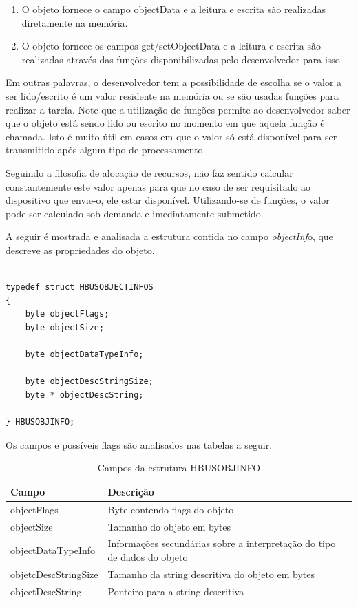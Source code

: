 \documentclass[11pt]{report}
\begin{document}
\begin{enumerate}

\item O objeto fornece o campo objectData e a leitura e escrita são realizadas diretamente na memória.
\item O objeto fornece os campos get/setObjectData e a leitura e escrita são realizadas através das funções disponibilizadas pelo desenvolvedor para isso.

\end{enumerate}

Em outras palavras, o desenvolvedor tem a possibilidade de escolha se o valor a ser lido/escrito é um valor residente na memória ou se são usadas funções para realizar a tarefa. Note que a utilização de funções permite ao desenvolvedor saber que o objeto está sendo lido ou escrito no momento em que aquela função é chamada. Isto é muito útil em casos em que o valor só está disponível para ser transmitido após algum tipo de processamento.

Seguindo a filosofia de alocação de recursos, não faz sentido calcular constantemente este valor apenas para que no caso de ser requisitado ao dispositivo que envie-o, ele estar disponível. Utilizando-se de funções, o valor pode ser calculado sob demanda e imediatamente submetido.

\vskip1cm

A seguir é mostrada e analisada a estrutura contida no campo \textit{objectInf}o, que descreve as propriedades do objeto.

\pagebreak

\begin{verbatim}

typedef struct HBUSOBJECTINFOS
{
	byte objectFlags;
	byte objectSize;
	
	byte objectDataTypeInfo;
	
	byte objectDescStringSize;
	byte * objectDescString;
	
} HBUSOBJINFO;

\end{verbatim}

Os campos e possíveis flags são analisados nas tabelas a seguir.

\begin{table}[H]
\centering
\caption{Campos da estrutura HBUSOBJINFO}
\begin{tabular}{l p{10cm}}

\hline
Campo					&	Descrição\\
\hline
objectFlags				&	Byte contendo flags do objeto\\
objectSize				&	Tamanho do objeto em bytes\\
objectDataTypeInfo		&	Informações secundárias sobre a interpretação do tipo de dados do objeto\\
objetcDescStringSize		&	Tamanho da string descritiva do objeto em bytes\\
objectDescString			&	Ponteiro para a string descritiva\\
\hline

\end{tabular}
\end{table}
\end{document}
